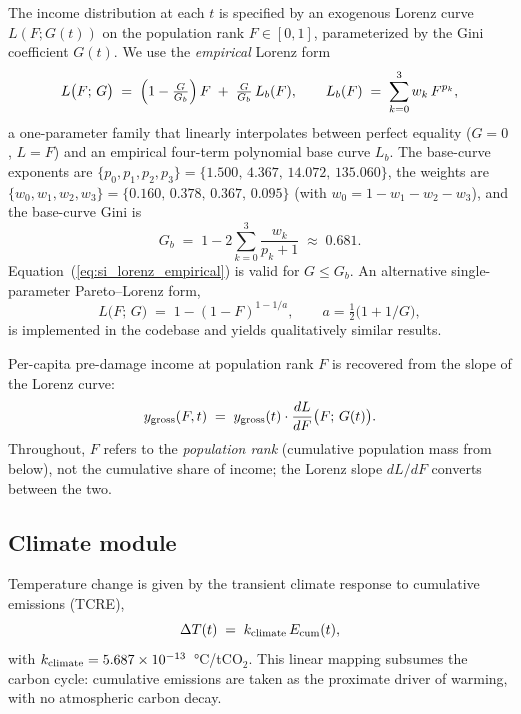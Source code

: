 The income distribution at each $t$ is specified by an exogenous Lorenz curve $L(F; G(t))$ on the population rank $F \in [0,1]$, parameterized by the Gini coefficient $G(t)$.  We use the \emph{empirical} Lorenz form
\begin{equation}\label{eq:si_lorenz_empirical}
L\bigl(F;\, G\bigr) \;=\; \Bigl(1 - \tfrac{G}{G_b}\Bigr)\, F \;+\; \tfrac{G}{G_b}\, L_b(F),
\qquad
L_b(F) \;=\; \sum_{k=0}^{3} w_k\, F^{p_k}, %
\end{equation}
a one-parameter family that linearly interpolates between perfect equality ($G=0$, $L=F$) and an empirical four-term polynomial base curve $L_b$.  The base-curve exponents are $\{p_0, p_1, p_2, p_3\} = \{1.500,\,4.367,\,14.072,\,135.060\}$, the weights are $\{w_0, w_1, w_2, w_3\} = \{0.160,\,0.378,\,0.367,\,0.095\}$ (with $w_0 = 1 - w_1 - w_2 - w_3$), and the base-curve Gini is
\begin{equation}\label{eq:si_Gbase}
G_b \;=\; 1 - 2 \sum_{k=0}^{3} \frac{w_k}{p_k + 1} \;\approx\; 0.681. %
\end{equation}
Equation~(\ref{eq:si_lorenz_empirical}) is valid for $G \le G_b$.  An alternative single-parameter Pareto--Lorenz form,
\begin{equation}\label{eq:si_lorenz_pareto}
L\bigl(F;\, G\bigr) \;=\; 1 - (1-F)^{1 - 1/a}, \qquad a = \tfrac{1}{2}\bigl(1 + 1/G\bigr), %
\end{equation}
is implemented in the codebase and yields qualitatively similar results.

Per-capita pre-damage income at population rank $F$ is recovered from the slope of the Lorenz curve:
\begin{equation}\label{eq:si_y_of_F}
y_{\rm gross}(F, t) \;=\; y_{\rm gross}(t) \cdot \frac{dL}{dF}\bigl(F;\, G(t)\bigr). %
\end{equation}
Throughout, $F$ refers to the \emph{population rank} (cumulative population mass from below), not the cumulative share of income; the Lorenz slope $dL/dF$ converts between the two.

\subsection*{Climate module}\label{si:climate}

Temperature change is given by the transient climate response to cumulative emissions (TCRE),
\begin{equation}\label{eq:si_tcre}
\Delta T(t) \;=\; k_{\rm climate}\, E_{\rm cum}(t), %
\end{equation}
with $k_{\rm climate} = 5.687 \times 10^{-13}$~\si{\celsius}/tCO$_2$.  This linear mapping subsumes the carbon cycle: cumulative emissions are taken as the proximate driver of warming, with no atmospheric carbon decay.

